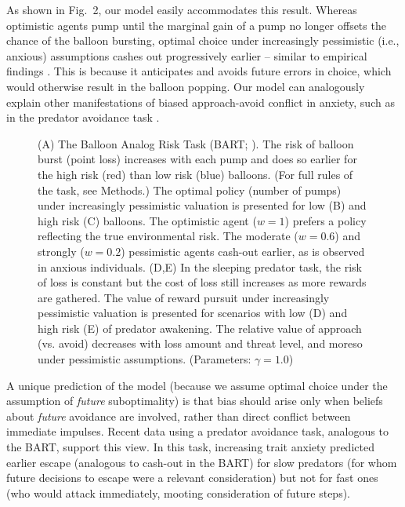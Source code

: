 \documentclass[manuscript]{stjour}
\begin{document}
As shown in Fig.~2, our model easily accommodates this result. Whereas optimistic agents pump until the marginal gain of a pump no longer offsets the chance of the balloon bursting, optimal choice under increasingly pessimistic (i.e., anxious) assumptions cashes out progressively earlier -- similar to empirical findings \citep{Maner2007, ramirez2015}. This is because it anticipates and avoids future errors in choice, which would otherwise result in the balloon popping. Our model can analogously explain other manifestations of biased approach-avoid conflict in anxiety, such as in the predator avoidance task \citep{fung2019}. 

\begin{figure}[!t]
\caption{(A) The Balloon Analog Risk Task (BART; \citealp{Lejuez2002}). The risk of balloon burst (point loss) increases with each pump and does so earlier for the high risk (red) than low risk (blue) balloons. (For full rules of the task, see Methods.) The optimal policy (number of pumps) under increasingly pessimistic valuation is presented for low (B) and high risk (C) balloons. The optimistic agent ($w=1$) prefers a policy reflecting the true environmental risk. The moderate ($w=0.6$) and strongly ($w=0.2$) pessimistic agents cash-out earlier, as is observed in anxious individuals. (D,E) In the sleeping predator task, the risk of loss is constant but the cost of loss still increases as more rewards are gathered. The value of reward pursuit under increasingly pessimistic valuation is presented for scenarios with low (D) and high risk (E)  of predator awakening. The relative value of approach (vs. avoid) decreases with loss amount and threat level, and moreso under pessimistic assumptions. (Parameters: $\gamma = 1.0$)}
\label{fig:appavo}
\end{figure}

A unique prediction of the model (because we assume optimal choice under the assumption of \emph{future} suboptimality) is that bias should arise only when beliefs about \emph{future} avoidance are involved, rather than direct conflict between immediate impulses. Recent data \citep{fung2019} using a predator avoidance task, analogous to the BART, support this view. In this task, increasing trait anxiety predicted earlier escape (analogous to cash-out in the BART) for slow predators (for whom future decisions to escape were a relevant consideration) but not for fast ones (who would attack immediately, mooting consideration of future steps). 
\end{document}
